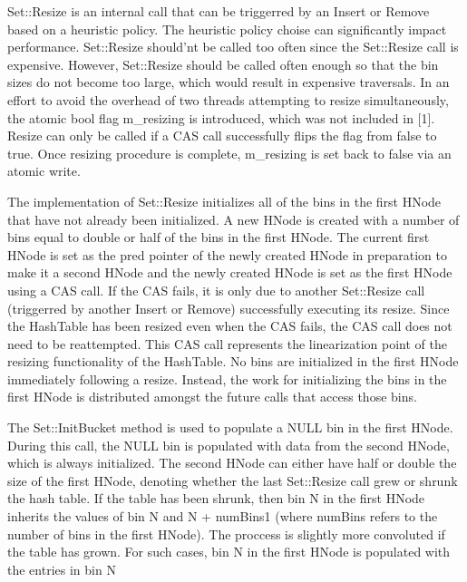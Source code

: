 \documentclass[11pt]{article} %
\begin{document}
Set::Resize is an internal call that can be triggerred by an Insert or Remove based on a heuristic policy. The heuristic policy choise can significantly impact performance. Set::Resize should'nt be called too often since the Set::Resize call is expensive. However, Set::Resize should be called often enough so that the bin sizes do not become too large, which would result in expensive traversals. In an effort to avoid the overhead of two threads attempting to resize simultaneously, the atomic bool flag m_resizing is introduced, which was not included in [1]. Resize can only be called if a CAS call successfully flips the flag from false to true. Once resizing procedure is complete, m_resizing is set back to false via an atomic write.

The implementation of Set::Resize initializes all of the bins in the first HNode that have not already been initialized. A new HNode is created with a number of bins equal to double or half of the bins in the first HNode. The current first HNode is set as the pred pointer of the newly created HNode in preparation to make it a second HNode and the newly created HNode is set as the first HNode using a CAS call. If the CAS fails, it is only due to another Set::Resize call (triggerred by another Insert or Remove) successfully executing its resize. Since the HashTable has been resized even when the CAS fails, the CAS call does not need to be reattempted. This CAS call represents the linearization point of the resizing functionality of the HashTable. No bins are initialized in the first HNode immediately following a resize. Instead, the work for initializing the bins in the first HNode is distributed amongst the future calls that access those bins.

The Set::InitBucket method is used to populate a NULL bin in the first HNode. During this call, the NULL bin is populated with data from the second HNode, which is always initialized. The second HNode can either have half or double the size of the first HNode, denoting whether the last Set::Resize call grew or shrunk the hash table. If the table has been shrunk, then bin N in the first HNode inherits the values of bin N and N + numBins1 (where numBins refers to the number of bins in the first HNode). The proccess is slightly more convoluted if the table has grown. For such cases, bin N in the first HNode is populated with the entries in bin N %
\end{document}
